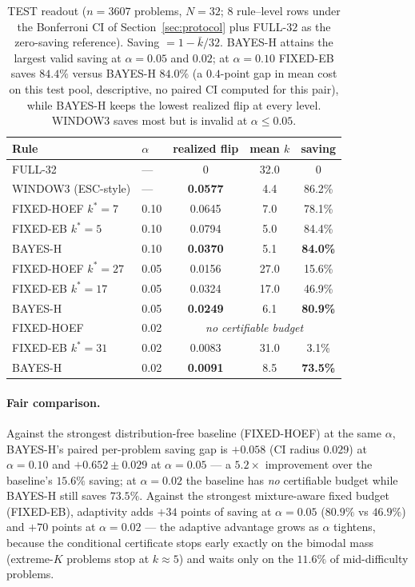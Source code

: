 \documentclass{article}
\theoremstyle{definition}
\theoremstyle{remark}
\begin{document}
\begin{table}[t]
\centering\small
\caption{TEST readout ($n=3607$ problems, $N=32$; $8$ rule--level rows
under the Bonferroni CI of Section~\ref{sec:protocol} plus FULL-$32$ as the
zero-saving reference). Saving $=1-\bar k/32$.
BAYES-H attains the largest valid saving at $\alpha=0.05$ and $0.02$;
at $\alpha=0.10$ FIXED-EB saves $84.4\%$ versus BAYES-H $84.0\%$ (a
$0.4$-point gap in mean cost on this test pool, descriptive, no paired
CI computed for this pair), while BAYES-H keeps the lowest realized
flip at every level.
WINDOW3 saves most but is invalid at $\alpha\le0.05$.}
\label{tab:main}
\begin{tabular}{llccc}
\toprule
Rule & $\alpha$ & realized flip & mean $k$ & saving \\
\midrule
FULL-32 & --- & 0 & 32.0 & 0 \\
WINDOW3 (ESC-style) & --- & \textbf{0.0577} & 4.4 & 86.2\% \\
\midrule
FIXED-HOEF $k^*{=}7$  & 0.10 & 0.0645 & 7.0 & 78.1\% \\
FIXED-EB   $k^*{=}5$  & 0.10 & 0.0794 & 5.0 & 84.4\% \\
BAYES-H               & 0.10 & \textbf{0.0370} & 5.1 & \textbf{84.0\%} \\
\midrule
FIXED-HOEF $k^*{=}27$ & 0.05 & 0.0156 & 27.0 & 15.6\% \\
FIXED-EB   $k^*{=}17$ & 0.05 & 0.0324 & 17.0 & 46.9\% \\
BAYES-H               & 0.05 & \textbf{0.0249} & 6.1 & \textbf{80.9\%} \\
\midrule
FIXED-HOEF & 0.02 & \multicolumn{3}{c}{\emph{no certifiable budget}} \\
FIXED-EB   $k^*{=}31$ & 0.02 & 0.0083 & 31.0 & 3.1\% \\
BAYES-H               & 0.02 & \textbf{0.0091} & 8.5 & \textbf{73.5\%} \\
\bottomrule
\end{tabular}
\end{table}

\paragraph{Fair comparison.} Against the strongest distribution-free baseline
(FIXED-HOEF) at the same $\alpha$, BAYES-H's paired per-problem saving gap is
$+0.058$ (CI radius $0.029$) at $\alpha=0.10$ and $+0.652\pm0.029$ at
$\alpha=0.05$ --- a $5.2\times$ improvement over the baseline's $15.6\%$
saving; at $\alpha=0.02$ the baseline has \emph{no} certifiable budget while
BAYES-H still saves $73.5\%$. Against the strongest mixture-aware fixed budget
(FIXED-EB), adaptivity adds $+34$ points of saving at $\alpha=0.05$
($80.9\%$ vs $46.9\%$) and $+70$ points at $\alpha=0.02$ --- the adaptive
advantage grows as $\alpha$ tightens, because the conditional certificate
stops early exactly on the bimodal mass (extreme-$K$ problems stop at
$k\approx5$) and waits only on the $11.6\%$ of mid-difficulty problems.
\end{document}
